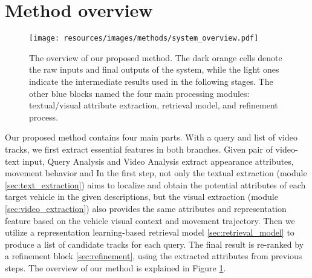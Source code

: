 \section{Method overview}
\label{sec:method_overview}
\begin{figure}[!htb]
    \centering
    \texttt{[image: resources/images/methods/system\_overview.pdf]}
    \caption{The overview of our proposed method. The dark orange cells denote the raw inputs and final outputs of the system, while the light ones indicate the intermediate results used in the following stages. The other blue blocks named the four main processing modules: textual/visual attribute extraction, retrieval model, and refinement process.}
    \label{fig:method_overview}
\end{figure}
Our proposed method contains four main parts. With a query and list of video tracks, we first extract essential features in both branches. 
Given pair of video-text input, Query Analysis and Video Analysis extract appearance attributes, movement behavior and 
In the first step, not only the textual extraction (module \ref{sec:text_extraction}) aims to localize and obtain the potential attributes of each target vehicle in the given descriptions, but the visual extraction (module \ref{sec:video_extraction}) also provides the same attributes and representation feature based on the vehicle visual context and movement trajectory. 
Then we utilize a representation learning-based retrieval model \ref{sec:retrieval_model} to produce a list of candidate tracks for each query. 
The final result is re-ranked by a refinement block \ref{sec:refinement}, using the extracted attributes from previous steps. The overview of our method is explained in Figure \ref{fig:method_overview}.
